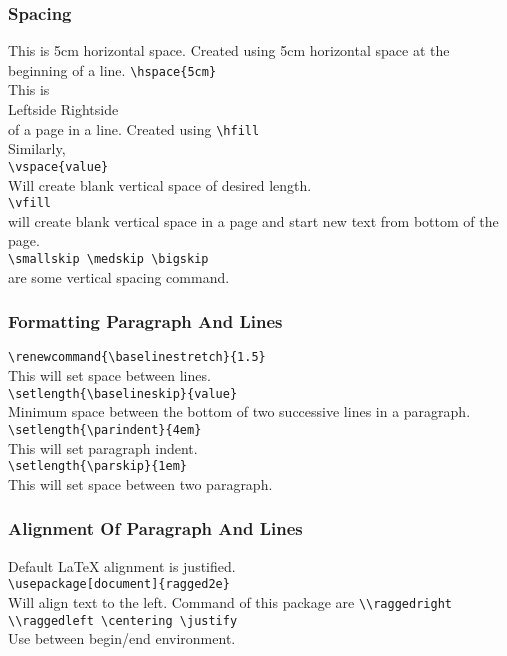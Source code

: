 \documentclass[10pt]{article}
\begin{document}
{\subsubsection{Spacing}
This is \hspace{5cm} 5cm horizontal space.
Created using
\hspace*{5cm} 5cm horizontal space
at the beginning of a line.
\verb|\hspace{5cm}| \\
This is\\
Leftside \hfill Rightside \\
of a page in a line. Created using
\verb|\hfill| \\
Similarly, \\
\verb|\vspace{value}| \\
Will create blank
vertical space of desired length.\\
\verb|\vfill| \\
will create blank
vertical space
in a page
and start new text from
bottom of the page. \\
\verb|\smallskip \medskip \bigskip| \\
are some vertical spacing command.

\subsubsection{Formatting Paragraph And  Lines}
\verb|\renewcommand{\baselinestretch}{1.5}| \\
This will set space between lines. \\
\verb|\setlength{\baselineskip}{value}| \\
Minimum space between the bottom of
two successive lines in a paragraph. \\
\verb|\setlength{\parindent}{4em}| \\
This will set paragraph indent. \\
\verb|\setlength{\parskip}{1em}| \\
This will set space between two paragraph.

\subsubsection{Alignment Of Paragraph And Lines}
Default \LaTeX{} alignment is justified. \\
\verb|\usepackage[document]{ragged2e}| \\
Will align text to the left.
Command of this package are
\verb|\\raggedright \\raggedleft \centering \justify| \\
Use between begin/end environment.

}
\end{document}
